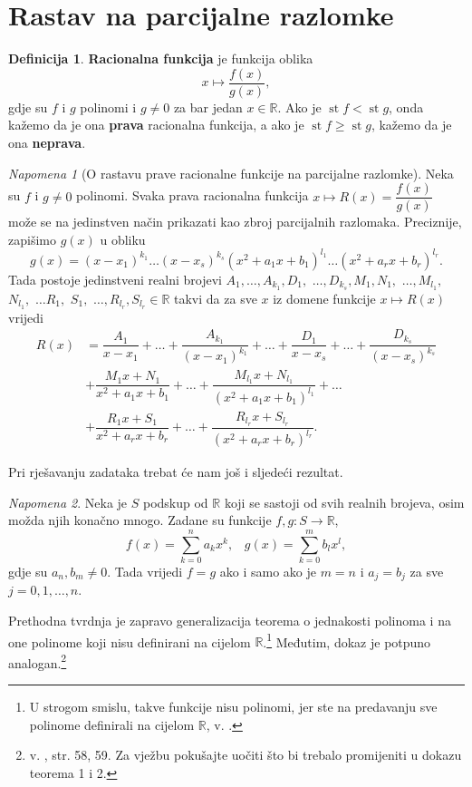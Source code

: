 \documentclass{book}
\DeclareMathOperator{\st}{st}
\theoremstyle{definition}
\theoremstyle{definition}
\newtheorem{definition}{Definicija}
\theoremstyle{remark}
\newtheorem{remark}{Napomena}
\begin{document}
\section{Rastav na parcijalne razlomke}

\begin{definition}
\textbf{Racionalna funkcija} je funkcija oblika
$$x\mapsto \dfrac{f(x)}{g(x)},$$
gdje su $f$ i $g$ polinomi i $g\neq 0$ za bar jedan $x\in \mathbb{R}$. Ako je $\st{f}<\st{g}$, onda kažemo da je ona \textbf{prava} racionalna funkcija, a ako je $\st{f}\geq \st{g}$, kažemo da je ona \textbf{neprava}.
\end{definition}

\begin{remark}[O rastavu prave racionalne funkcije na parcijalne razlomke]
\label{partfrac}
Neka su $f$ i $g\neq 0$ polinomi. Svaka prava racionalna funkcija $x\mapsto R(x)=\dfrac{f(x)}{g(x)}$ može se na jedinstven način prikazati kao zbroj parcijalnih razlomaka. Preciznije, zapišimo $g(x)$ u obliku
$$g(x)=(x-x_1)^{k_1}\dots (x-x_s)^{k_s}(x^2+a_1x+b_1)^{l_1}\dots (x^2+a_rx+b_r)^{l_r}.$$
Tada postoje jedinstveni realni brojevi $A_1, \dots, A_{k_1}, D_1,$ $\dots, D_{k_s}, M_1, N_1,$ $ \dots, M_{l_1},$ $ N_{l_1},$ $ \dots R_1,$ $ S_1,$ $\dots, R_{l_r}, S_{l_r}\in \mathbb{R}$ takvi da za sve $x$ iz domene funkcije $x\mapsto R(x)$ vrijedi
\begin{align*}
R(x)&=\dfrac{A_1}{x-x_1}+\dots+\dfrac{A_{k_1}}{(x-x_1)^{k_1}}+\dots+\dfrac{D_1}{x-x_s}+\dots+\dfrac{D_{k_s}}{(x-x_s)^{k_s}} \\
&+\dfrac{M_1x+N_1}{x^2+a_1x+b_1}+\dots+\dfrac{M_{l_1}x+N_{l_1}}{(x^2+a_1x+b_1)^{l_1}}+\dots \\
&+\dfrac{R_1x+S_1}{x^2+a_rx+b_r}+\dots+\dfrac{R_{l_r}x+S_{l_r}}{(x^2+a_rx+b_r)^{l_r}}.
\end{align*}
\end{remark}
Pri rješavanju zadataka trebat će nam još i sljedeći rezultat.
\begin{remark}
\label{poleq}
Neka je $S$ podskup od $\mathbb{R}$ koji se sastoji od svih realnih brojeva, osim možda njih konačno mnogo. Zadane su funkcije $f, g : S\to \mathbb{R}$,
$$f(x)=\sum_{k=0}^n{a_kx^k},\;\;\;g(x)=\sum_{k=0}^m{b_lx^l},$$
gdje su $a_n, b_m\neq 0$. Tada vrijedi $f=g$ ako i samo ako je $m=n$ i $a_j=b_j$ za sve $j=0, 1, \dots, n$.
\end{remark}
Prethodna tvrdnja je zapravo generalizacija teorema o jednakosti polinoma i na one polinome koji nisu definirani na cijelom $\mathbb{R}$.\footnote{U strogom smislu, takve funkcije nisu polinomi, jer ste na predavanju sve polinome definirali na cijelom $\mathbb{R}$, v. \cite{3}.} Međutim, dokaz je potpuno analogan.\footnote{v. \cite{12}, str. 58, 59. Za vježbu pokušajte uočiti što bi trebalo promijeniti u dokazu teorema 1 i 2.}
\end{document}
